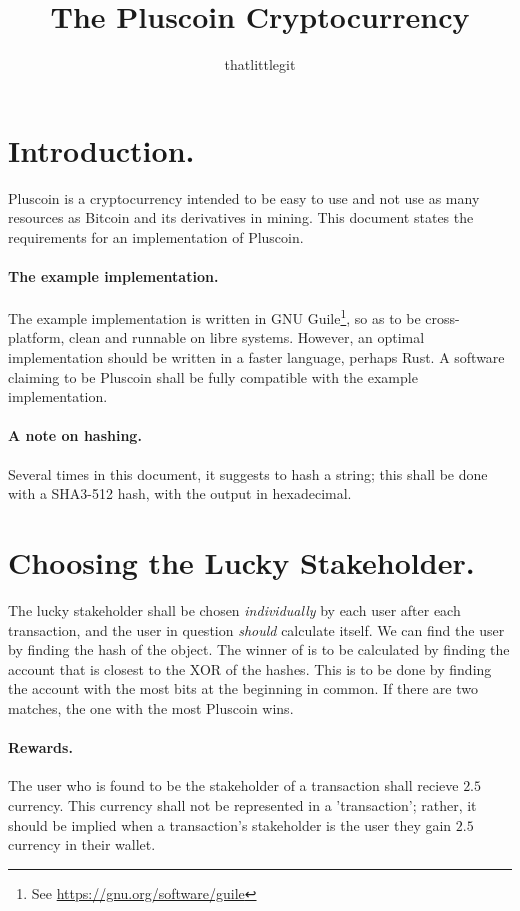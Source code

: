 \documentclass{article}
\title{The Pluscoin Cryptocurrency}
\author{thatlittlegit}
\date{}
\begin{document}
\maketitle
\tableofcontents
\newpage
{}

\section{Introduction.}
Pluscoin is a cryptocurrency intended to be easy to use and not use as many
resources as Bitcoin and its derivatives in mining. This document states the
requirements for an implementation of Pluscoin.

\paragraph{The example implementation.} The example implementation is written
in GNU Guile\footnote{See \url{https://gnu.org/software/guile}}, so as to be
cross-platform, clean and runnable on libre systems. However, an optimal
implementation should be written in a faster language, perhaps Rust. A software
claiming to be Pluscoin shall be fully compatible with the example
implementation.

\paragraph{A note on hashing.} Several times in this document, it suggests to
hash a string; this shall be done with a SHA3-512 hash, with the output in
hexadecimal.

\section{Choosing the Lucky Stakeholder.}
The lucky stakeholder shall be chosen {\it{individually}} by each user after
each transaction, and the user in question {\it{should}} calculate itself. We
can find the user by finding the hash of the object. The winner of is to be
calculated by finding the account that is closest to the XOR of the hashes.
This is to be done by finding the account with the most bits at the beginning
in common. If there are two matches, the one with the most Pluscoin wins.

\paragraph{Rewards.} The user who is found to be the stakeholder of a
transaction shall recieve $2.5$ currency. This currency shall not be
represented in a 'transaction'; rather, it should be implied when a
transaction's stakeholder is the user they gain $2.5$ currency in their wallet.
\end{document}
